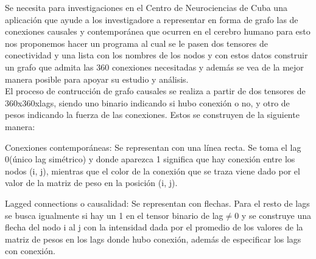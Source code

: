\documentclass[a4paper,10pt,twocolumn]{article}
\begin{document}
Se necesita para investigaciones en el Centro de Neurociencias de Cuba una aplicación que ayude a los investigadore a representar en forma de grafo las de conexiones causales y contemporánea que ocurren en el cerebro humano para esto nos proponemos hacer un programa al cual se le pasen dos tensores de conectividad y una lista con los nombres de los nodos y con estos datos construir un grafo que admita las 360 conexiones necesitadas y además se vea de la mejor manera posible para apoyar su estudio y análisis.\\

El proceso de contrucción de grafo causales se realiza a partir de dos tensores de 360x360xlags, siendo uno binario indicando si hubo conexión o no, y otro de pesos indicando la fuerza de las conexiones. Estos se construyen de la siguiente manera:

\begin{description}


\item	Conexiones contemporáneas: Se representan con una línea recta. Se toma el lag 0(único lag simétrico) y donde aparezca 1 significa que hay conexión entre los nodos (i, j), mientras que el color de la conexión que se traza viene dado por el valor de la matriz de peso en la posición (i, j).\\

\item	Lagged connections o causalidad: Se representan con flechas. Para el resto de lags se busca igualmente si hay un 1 en el tensor binario de 
lag$\neq $0 y se construye una flecha del nodo i al j con la intensidad dada por el promedio de los valores de la matriz de pesos en los lags donde hubo conexión, además de especificar los lags con conexión.\\

\end{description}
\end{document}
